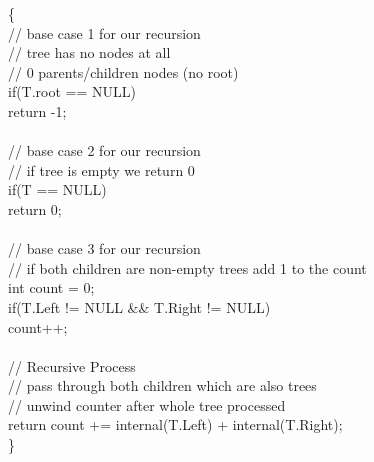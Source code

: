 \documentclass{article}
\begin{document}
\hspace*{150pt}\{\\
\hspace*{165pt}// base case 1 for our recursion\\
\hspace*{165pt}// tree has no nodes at all \\
\hspace*{165pt}// 0 parents/children nodes (no root)\\
\hspace*{165pt} if(T.root == NULL)\\
\hspace*{180pt} return -1;\\\\
\hspace*{165pt}// base case 2 for our recursion \\
\hspace*{165pt}// if tree is empty we return 0 \\
\hspace*{165pt} if(T == NULL)\\
\hspace*{180pt} return 0;\\\\
\hspace*{165pt}// base case 3 for our recursion \\
\hspace*{165pt}// if both children are non-empty trees add 1 to the count \\
\hspace*{165pt} int count = 0;\\
\hspace*{165pt} if(T.Left != NULL \&\& T.Right != NULL)\\
\hspace*{180pt} count++;\\\\
\hspace*{165pt}// Recursive Process \\
\hspace*{165pt}// pass through both children which are also trees \\
\hspace*{165pt}// unwind counter after whole tree processed \\
\hspace*{165pt} return count += internal(T.Left) + internal(T.Right);\\
\hspace*{150pt}\}\\\\
\end{document}
